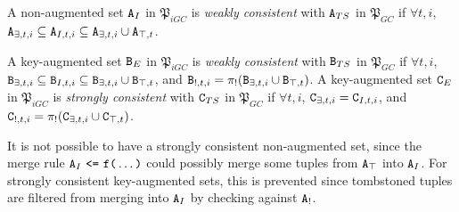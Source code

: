 \begin{property}
A non-augmented set $\tt{A}_I$ in $\mathfrak{P}_{iGC}$ is \emph{weakly consistent} with $\tt{A}_{TS}$ in $\mathfrak{P}_{GC}$ if $\forall t, i$, $\tt{A}_{\exists,t,i} \subseteq \tt{A}_{I,t,i} \subseteq \tt{A}_{\exists,t,i} \cup \tt{A}_{\top,t}$.

A key-augmented set $\tt{B}_E$ in $\mathfrak{P}_{iGC}$ is \emph{weakly consistent} with $\tt{B}_{TS}$ in $\mathfrak{P}_{GC}$ if $\forall t, i$, $\tt{B}_{\exists,t,i} \subseteq \tt{B}_{I,t,i} \subseteq \tt{B}_{\exists,t,i} \cup \tt{B}_{\top,t}$, and $\tt{B}_{!,t,i} = \pi_!(\tt{B}_{\exists,t,i} \cup \tt{B}_{\top,t})$.
A key-augmented set $\tt{C}_E$ in $\mathfrak{P}_{iGC}$ is \emph{strongly consistent} with $\tt{C}_{TS}$ in $\mathfrak{P}_{GC}$ if $\forall t, i$, $\tt{C}_{\exists,t,i} = \tt{C}_{I,t,i}$, and $\tt{C}_{!,t,i} = \pi_!(\tt{C}_{\exists,t,i} \cup \tt{C}_{\top,t})$.
\end{property}

It is not possible to have a strongly consistent non-augmented set, since the merge rule $\tt{A}_I ~\tt{<=}~ \tt{f}\tt{(}\dots\tt{)}$ could possibly merge some tuples from $\tt{A}_\top$ into $\tt{A}_I$.
For strongly consistent key-augmented sets, this is prevented since tombstoned tuples are filtered from merging into $\tt{A}_I$ by checking against $\tt{A}_!$.


